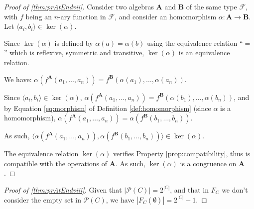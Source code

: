 \label{proofsection:prAtEndvii}\begin{proof}[Proof of \autoref{thm:prAtEndvii}]\label{proof:prAtEndvii}Consider two algebras $\boldsymbol {A}$ and $\boldsymbol {B}$ of the same type $\mathcal {F}$, with $f$ being an $n$-ary function in $\mathcal {F}$, and consider an homomorphism $\alpha : \boldsymbol {A} \rightarrow \boldsymbol {B}$. Let $\langle a_i,b_i \rangle \in \ker (\alpha )$. \par Since $\ker (\alpha )$ is defined by $\alpha (a) = \alpha (b)$ using the equivalence relation ``$=$'' which is reflexive, symmetric and transitive, $\ker (\alpha )$ is an equivalence relation. \par We have: $\alpha (f^{\boldsymbol {A}}(a_1, \dots , a_n)) = f^{\boldsymbol {B}}(\alpha (a_1), \dots , \alpha (a_n))$. \par Since $\langle a_i,b_i \rangle \in \ker (\alpha )$, $\alpha (f^{\boldsymbol {A}}(a_1, \dots , a_n)) = f^{\boldsymbol {B}}(\alpha (b_1), \dots , \alpha (b_n))$, and by Equation \ref {eq:morphism} of Definition \ref {def:homomorphism} (since $\alpha $ is a homomorphism), $\alpha (f^{\boldsymbol {A}}(a_1, \dots , a_n)) = \alpha (f^{\boldsymbol {B}}(b_1, \dots , b_n))$. \par As such, $\langle \alpha (f^{\boldsymbol {A}}(a_1, \dots , a_n)), \alpha (f^{\boldsymbol {B}}(b_1, \dots , b_n)) \rangle \in \ker (\alpha )$. \par The equivalence relation $\ker (\alpha )$ verifies Property \ref {prop:compatibility}, thus is compatible with the operations of $\boldsymbol {A}$. As such, $\ker (\alpha )$ is a congruence on $\boldsymbol {A}$.\end{proof}
\label{proofsection:prAtEndviii}\begin{proof}[Proof of \autoref{thm:prAtEndviii}]\label{proof:prAtEndviii}Given that $|\mathcal {P}(C)| = 2^{|C|}$, and that in $F_C$ we don't consider the empty set in $\mathcal {P}(C)$, we have $|F_C(\emptyset )| = 2^{|C|} -1$.\end{proof}

